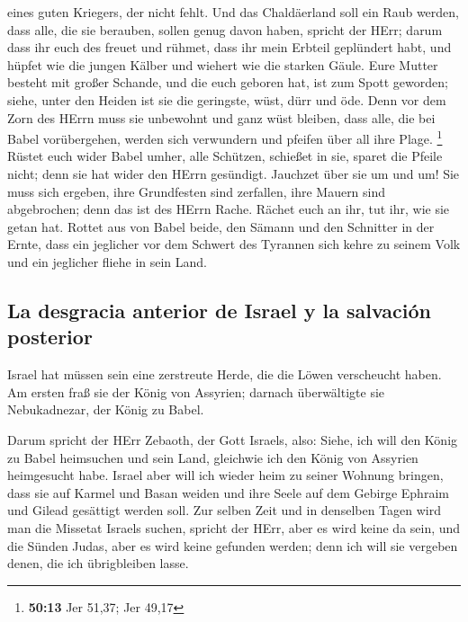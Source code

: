 eines guten Kriegers, der nicht fehlt.  Und das
Chaldäerland soll ein Raub werden, dass alle, die sie berauben, sollen
genug davon haben, spricht der HErr;  darum dass ihr euch
des freuet und rühmet, dass ihr mein Erbteil geplündert habt, und hüpfet
wie die jungen Kälber und wiehert wie die starken Gäule. 
Eure Mutter besteht mit großer Schande, und die euch geboren hat, ist
zum Spott geworden; siehe, unter den Heiden ist sie die geringste, wüst,
dürr und öde.  Denn vor dem Zorn des HErrn muss sie
unbewohnt und ganz wüst bleiben, dass alle, die bei Babel vorübergehen,
werden sich verwundern und pfeifen über all ihre Plage. \footnote{\textbf{50:13}
  Jer 51,37; Jer 49,17}  Rüstet euch wider Babel umher,
alle Schützen, schießet in sie, sparet die Pfeile nicht; denn sie hat
wider den HErrn gesündigt.  Jauchzet über sie um und um!
Sie muss sich ergeben, ihre Grundfesten sind zerfallen, ihre Mauern sind
abgebrochen; denn das ist des HErrn Rache. Rächet euch an ihr, tut ihr,
wie sie getan hat.  Rottet aus von Babel beide, den
Sämann und den Schnitter in der Ernte, dass ein jeglicher vor dem
Schwert des Tyrannen sich kehre zu seinem Volk und ein jeglicher fliehe
in sein Land.

\hypertarget{la-desgracia-anterior-de-israel-y-la-salvaciuxf3n-posterior}{%
\subsection{La desgracia anterior de Israel y la salvación
posterior}\label{la-desgracia-anterior-de-israel-y-la-salvaciuxf3n-posterior}}

 Israel hat müssen sein eine zerstreute Herde, die die
Löwen verscheucht haben. Am ersten fraß sie der König von Assyrien;
darnach überwältigte sie Nebukadnezar, der König zu Babel.

 Darum spricht der HErr Zebaoth, der Gott Israels, also:
Siehe, ich will den König zu Babel heimsuchen und sein Land, gleichwie
ich den König von Assyrien heimgesucht habe.  Israel aber
will ich wieder heim zu seiner Wohnung bringen, dass sie auf Karmel und
Basan weiden und ihre Seele auf dem Gebirge Ephraim und Gilead gesättigt
werden soll.  Zur selben Zeit und in denselben Tagen wird
man die Missetat Israels suchen, spricht der HErr, aber es wird keine da
sein, und die Sünden Judas, aber es wird keine gefunden werden; denn ich
will sie vergeben denen, die ich übrigbleiben lasse.

